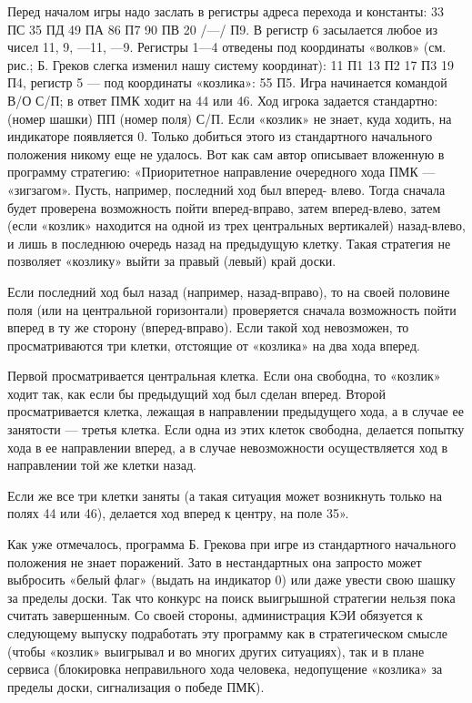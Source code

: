 \documentclass[11pt,a4paper,oneside]{article}
\begin{document}
Перед началом игры надо заслать в регистры адреса перехода и константы: 33 ПС 35 ПД 49 ПА 86 П7 90 ПВ 20 /—/ П9. В регистр 6 засылается любое из чисел 11, 9, —11, —9. Регистры 1—4 отведены под координаты «волков» (см. рис.; Б. Греков слегка изменил нашу систему координат): 11 П1 13 П2 17 П3 19 П4, регистр 5 — под координаты «козлика»: 55 П5. Игра начинается командой В/О С/П; в ответ ПМК ходит на 44 или 46. Ход игрока задается стандартно: (номер шашки) ПП (номер поля) С/П. Если «козлик» не знает, куда ходить, на индикаторе появляется 0. Только добиться этого из стандартного начального положения никому еще не удалось. Вот как сам автор описывает вложенную в программу стратегию:
«Приоритетное направление очередного хода ПМК — «зигзагом». Пусть, например, последний ход был вперед- влево. Тогда сначала будет проверена возможность пойти вперед-вправо, затем вперед-влево, затем (если «козлик» находится на одной из трех центральных вертикалей) назад-влево, и лишь в последнюю очередь назад на предыдущую клетку. Такая стратегия не позволяет «козлику» выйти за правый (левый) край доски.

Если последний ход был назад (например, назад-вправо), то на своей половине поля (или на центральной горизонтали) проверяется сначала возможность пойти вперед в ту же сторону (вперед-вправо). Если такой ход невозможен, то просматриваются три клетки, отстоящие от «козлика» на два хода вперед.

Первой просматривается центральная клетка. Если она свободна, то «козлик» ходит так, как если бы предыдущий ход был сделан вперед. Второй просматривается клетка, лежащая в направлении предыдущего хода, а в случае ее занятости — третья клетка. Если одна из этих клеток свободна, делается попытку хода в ее направлении вперед, а в случае невозможности осуществляется ход в направлении той же клетки назад.

Если же все три клетки заняты (а такая ситуация может возникнуть только на полях 44 или 46), делается ход вперед к центру, на поле 35».

Как уже отмечалось, программа Б. Грекова при игре из стандартного начального положения не знает поражений. Зато в нестандартных она запросто может выбросить «белый флаг» (выдать на индикатор 0) или даже увести свою шашку за пределы доски. Так что конкурс на поиск выигрышной стратегии нельзя пока считать завершенным. Со своей стороны, администрация КЭИ обязуется к следующему выпуску подработать эту программу как в стратегическом смысле (чтобы «козлик» выигрывал и во многих других ситуациях), так и в плане сервиса (блокировка неправильного хода человека, недопущение «козлика» за пределы доски, сигнализация о победе ПМК).
\end{document}
